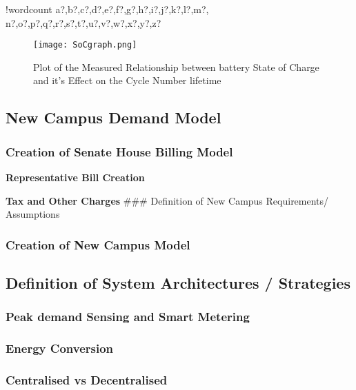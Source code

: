 \documentclass[fontsize=9.5pt]{extarticle}
\newcounter{words}
\newenvironment{counted}{%
  \setcounter{words}{0}
  \SearchList!{wordcount}{\stepcounter{words}}
    {a?,b?,c?,d?,e?,f?,g?,h?,i?,j?,k?,l?,m?,
    n?,o?,p?,q?,r?,s?,t?,u?,v?,w?,x?,y?,z?}
  \UndoBoundary{'}
  \SearchOrder{p;}}{%
  \StopSearching}
\begin{document}
\begin{counted}
\begin{itemize}
  \begin{figure}[H]
  \centering
  \texttt{[image: SoCgraph.png]}
  \caption{Plot of the Measured  Relationship between battery State of Charge and it's Effect on the Cycle Number lifetime \cite{xu2016modeling}}
  \label{SoCgraph}
    \end{figure}
\end{itemize}

\subsection{New Campus Demand Model}\label{new-campus-demand-model}

\subsubsection{Creation of Senate House Billing
Model}\label{creation-of-senate-house-billing-model}

\textbf{Representative Bill Creation}

\textbf{Tax and Other Charges} \#\#\# Definition of New Campus
Requirements/ Assumptions

\subsubsection{Creation of New Campus
Model}\label{creation-of-new-campus-model}

\subsection{Definition of System Architectures /
Strategies}\label{definition-of-system-architectures-strategies}

\subsubsection{Peak demand Sensing and Smart
Metering}\label{peak-demand-sensing-and-smart-metering}

\subsubsection{Energy Conversion}\label{energy-conversion}

\subsubsection{Centralised vs
Decentralised}\label{centralised-vs-decentralised}


\end{counted}
\end{document}
